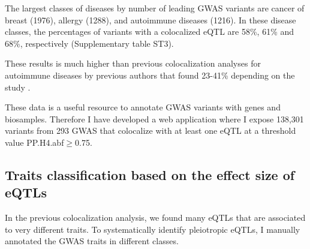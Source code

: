 The largest classes of diseases by number of leading GWAS variants are cancer of breast (1976), allergy (1288), and autoimmune diseases (1216).
%
In these disease classes, the percentages of variants with a colocalized eQTL are 58\%, 61\% and 68\%, respectively (Supplementary table ST3).

These results is much higher than previous colocalization analyses for autoimmune diseases by previous authors that
found 23-41\% depending on the study \citep{2016.Soranzo.Chen,2017.Cotsapas.Chun,2021.Li.Mu}.

These data is a useful resource to annotate GWAS variants with genes and biosamples.
Therefore I have developed a web application where I expose 138,301 variants from 293 GWAS that colocalize with at least
one eQTL at a threshold value PP.H4.abf$\geq$0.75.

%
\subsection*{Traits classification based on the effect size of eQTLs}
%

In the previous colocalization analysis, we found many eQTLs that are associated to very different traits.
%
To systematically identify pleiotropic eQTLs, I manually annotated the GWAS traits in different classes.

